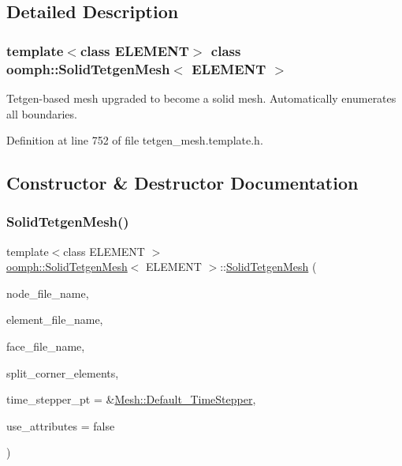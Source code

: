 \subsection{Detailed Description}
\subsubsection*{template$<$class E\+L\+E\+M\+E\+NT$>$\newline
class oomph\+::\+Solid\+Tetgen\+Mesh$<$ E\+L\+E\+M\+E\+N\+T $>$}

Tetgen-\/based mesh upgraded to become a solid mesh. Automatically enumerates all boundaries. 

Definition at line 752 of file tetgen\+\_\+mesh.\+template.\+h.



\subsection{Constructor \& Destructor Documentation}
\mbox{\label{classoomph_1_1SolidTetgenMesh_a0672182524354abfccbbd85007753bbe}} 
\subsubsection{\texorpdfstring{Solid\+Tetgen\+Mesh()}{SolidTetgenMesh()}\hspace{0.1cm}{\footnotesize\ttfamily [1/2]}}
{\footnotesize\ttfamily template$<$class E\+L\+E\+M\+E\+NT $>$ \\
\hyperlink{classoomph_1_1SolidTetgenMesh}{oomph\+::\+Solid\+Tetgen\+Mesh}$<$ E\+L\+E\+M\+E\+NT $>$\+::\hyperlink{classoomph_1_1SolidTetgenMesh}{Solid\+Tetgen\+Mesh} (\begin{DoxyParamCaption}\item[{const std\+::string \&}]{node\+\_\+file\+\_\+name,  }\item[{const std\+::string \&}]{element\+\_\+file\+\_\+name,  }\item[{const std\+::string \&}]{face\+\_\+file\+\_\+name,  }\item[{const bool \&}]{split\+\_\+corner\+\_\+elements,  }\item[{\hyperlink{classoomph_1_1TimeStepper}{Time\+Stepper} $\ast$}]{time\+\_\+stepper\+\_\+pt = {\ttfamily \&\hyperlink{classoomph_1_1Mesh_a12243d0fee2b1fcee729ee5a4777ea10}{Mesh\+::\+Default\+\_\+\+Time\+Stepper}},  }\item[{const bool \&}]{use\+\_\+attributes = {\ttfamily false} }\end{DoxyParamCaption})\hspace{0.3cm}{\ttfamily [inline]}}



